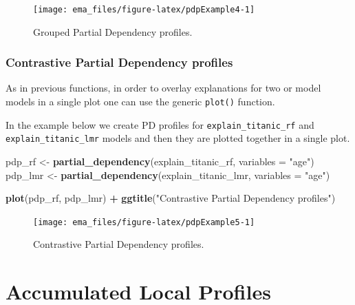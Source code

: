 \documentclass[12pt,]{krantz}
\newenvironment{Shaded}{\begin{snugshade}}{\end{snugshade}}
\newcommand{\DataTypeTok}[1]{\textcolor[rgb]{0.13,0.29,0.53}{#1}}
\newcommand{\KeywordTok}[1]{\textcolor[rgb]{0.13,0.29,0.53}{\textbf{#1}}}
\newcommand{\NormalTok}[1]{#1}
\newcommand{\OperatorTok}[1]{\textcolor[rgb]{0.81,0.36,0.00}{\textbf{#1}}}
\newcommand{\StringTok}[1]{\textcolor[rgb]{0.31,0.60,0.02}{#1}}
\begin{document}
\begin{figure}

{\centering \texttt{[image: ema\_files/figure-latex/pdpExample4-1]} 

}

\caption{Grouped Partial Dependency profiles.}\label{fig:pdpExample4}
\end{figure}

\hypertarget{contrastive-partial-dependency-profiles-2}{%
\subsubsection{Contrastive Partial Dependency profiles}\label{contrastive-partial-dependency-profiles-2}}

As in previous functions, in order to overlay explanations for two or model models in a single plot one can use the generic \texttt{plot()} function.

In the example below we create PD profiles for \texttt{explain\_titanic\_rf} and \texttt{explain\_titanic\_lmr} models and then they are plotted together in a single plot.

\begin{Shaded}
\begin{Highlighting}[]
\NormalTok{pdp_rf <-}\StringTok{ }\KeywordTok{partial_dependency}\NormalTok{(explain_titanic_rf, }\DataTypeTok{variables =} \StringTok{"age"}\NormalTok{)}
\NormalTok{pdp_lmr <-}\StringTok{ }\KeywordTok{partial_dependency}\NormalTok{(explain_titanic_lmr, }\DataTypeTok{variables =} \StringTok{"age"}\NormalTok{)}

\KeywordTok{plot}\NormalTok{(pdp_rf, pdp_lmr) }\OperatorTok{+}
\StringTok{  }\KeywordTok{ggtitle}\NormalTok{(}\StringTok{"Contrastive Partial Dependency profiles"}\NormalTok{) }
\end{Highlighting}
\end{Shaded}

\begin{figure}

{\centering \texttt{[image: ema\_files/figure-latex/pdpExample5-1]} 

}

\caption{Contrastive Partial Dependency profiles.}\label{fig:pdpExample5}
\end{figure}

\hypertarget{accumulatedLocalProfiles}{%
\section{Accumulated Local Profiles}\label{accumulatedLocalProfiles}}
\end{document}
